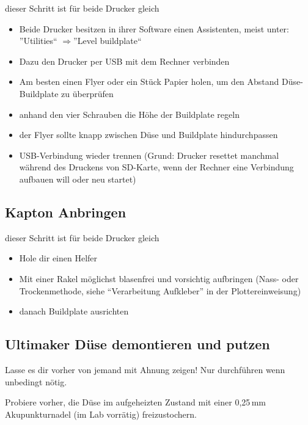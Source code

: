 \documentclass{\basedir/fablab-document}
\newcommand{\ra}{$\Rightarrow$}
\begin{document}
dieser Schritt ist für beide Drucker gleich
\begin{itemize}
\item Beide Drucker besitzen in ihrer Software einen Assistenten, meist unter: ''Utilities`` \ra ''Level buildplate``
\item Dazu den Drucker per USB mit dem Rechner verbinden
\item Am besten einen Flyer oder ein Stück Papier holen, um den Abstand Düse-Buildplate zu überprüfen
\item anhand den vier Schrauben die Höhe der Buildplate regeln
\item der Flyer sollte knapp zwischen Düse und Buildplate hindurchpassen
\item USB-Verbindung wieder trennen (Grund: Drucker resettet manchmal während des Druckens von SD-Karte, wenn der Rechner eine Verbindung aufbauen will oder neu startet)
\end{itemize}

\subsection{Kapton Anbringen}

dieser Schritt ist für beide Drucker gleich
\begin{itemize}
\item Hole dir einen Helfer
\item Mit einer Rakel möglichst blasenfrei und vorsichtig aufbringen (Nass- oder Trockenmethode, siehe \enquote{Verarbeitung Aufkleber} in der Plottereinweisung)
\item danach Buildplate ausrichten
\end{itemize}

\subsection{Ultimaker Düse demontieren und putzen}
Lasse es dir vorher von jemand mit Ahnung zeigen! Nur durchführen wenn unbedingt nötig.

Probiere vorher, die Düse im aufgeheizten Zustand mit einer 0,25\,mm Akupunkturnadel (im Lab vorrätig) freizustochern.
\end{document}
